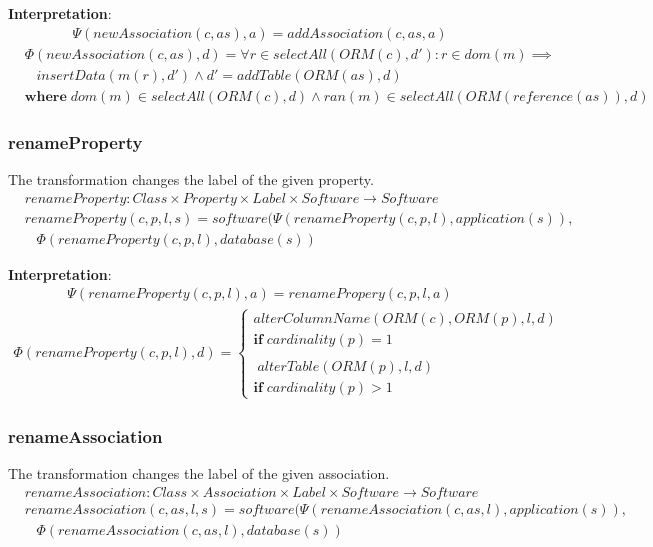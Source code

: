 \documentclass[10pt]{article}
\begin{document}
\noindent \textbf{Interpretation}:
\begin{align}
\Psi(newAssociation(c, as), a) = addAssociation(c, as, a)
\end{align}
\begin{align}
& \Phi(newAssociation(c, as), d) = \forall r \in selectAll(ORM(c), d') : r \in dom(m) \implies \nonumber \\ & \;\;\; insertData(m(r), d') \land d' = addTable(ORM(as),  d) \nonumber \\
& \mathbf{where} \; dom(m) \in selectAll(ORM(c),d) \land ran(m) \in selectAll(ORM(reference(as)), d)
\end{align}


\subsubsection{renameProperty}
The transformation changes the label of the given property.
\begin{align}
& renameProperty: Class \times Property \times Label \times Software \rightarrow Software \nonumber \\
& renameProperty(c, p, l, s) = software(\Psi(renameProperty(c, p, l), application(s)),  \nonumber \\ 
& \;\;\; \Phi(renameProperty(c, p, l), database(s))
\end{align}

\noindent \textbf{Interpretation}:
\begin{align}
\Psi(renameProperty(c, p, l), a) = renamePropery(c, p, l, a) 
\end{align}
\begin{align}
\Phi(renameProperty(c, p, l), d) = \begin{cases}
  alterColumnName(ORM(c), ORM(p), l,  d) \\ \mathbf{if} \; cardinality(p) = 1  \\\\ 
  \; alterTable(ORM(p), l,  d) \\
  \mathbf{if} \; cardinality(p) > 1  
   \end{cases}
\end{align}

\subsubsection{renameAssociation}
The transformation changes the label of the given association.
\begin{align}
& renameAssociation: Class \times Association \times Label \times Software \rightarrow Software \nonumber \\
& renameAssociation(c, as, l, s) = software(\Psi(renameAssociation(c, as, l), application(s)),  \nonumber \\ 
& \;\;\;\Phi(renameAssociation(c, as, l), database(s))
\end{align}
\end{document}
